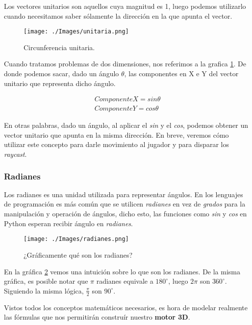 Los vectores unitarios son aquellos cuya magnitud es 1, luego podemos utilizarlo cuando necesitamos saber sólamente la dirección en la que apunta el vector.

\begin{figure}[h!]
	\centering
	\texttt{[image: ./Images/unitaria.png]}
	\caption{Circunferencia unitaria.}
	\label{unitaria}
\end{figure}


Cuando tratamos problemas de dos dimensiones, nos referimos a la grafica \ref{unitaria}. De donde podemos sacar, dado un ángulo $\theta$, las componentes en X e Y del vector unitario que representa dicho ángulo.

\begin{equation}
\begin{aligned}
\label{unitvector}
ComponenteX = sin \theta \\
ComponenteY = cos \theta
\end{aligned}
\end{equation}

En otras palabras, dado un ángulo, al aplicar el \emph{sin} y el \emph{cos}, podemos obtener un vector unitario que apunta en la misma dirección. En breve, veremos cómo utilizar este concepto para darle movimiento al jugador y para disparar los \emph{raycast}.

\subsubsection{Radianes}

Los radianes es una unidad utilizada para representar ángulos. En los lenguajes de programación es más común que se utilicen \emph{radianes} en vez de \emph{grados} para la manipulación y operación de ángulos, dicho esto, las funciones como \emph{sin} y \emph{cos} en Python esperan recibir ángulo en \emph{radianes}. 

\begin{figure}[h!]
	\centering
	\texttt{[image: ./Images/radianes.png]}
	\caption{¿Gráficamente qué son los radianes?}
	\label{rads}
\end{figure}

En la gráfica \ref{rads} vemos una intuición sobre lo que son los radianes. De la misma gráfica, es posible notar que $\pi$ radianes equivale a $180^{\circ}
$, luego $2\pi$ son $360^{\circ}$. Siguiendo la misma lógica, $\frac{\pi}{2}$ son  $90^{\circ}$.


Vistos todos los conceptos matemáticos necesarios, es hora de modelar realmente las fórmulas que nos permitirán construír nuestro \textbf{motor 3D}.


